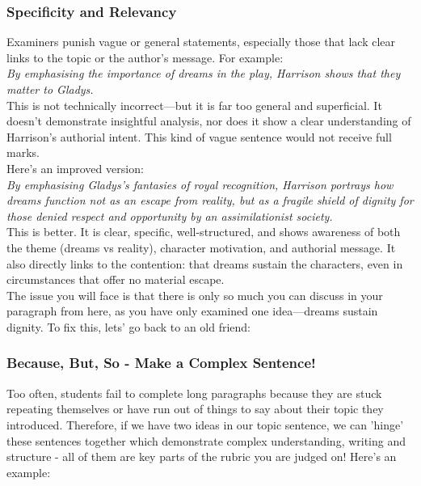 \documentclass[a4paper]{article}
\begin{document}
\subsubsection{Specificity and Relevancy}
Examiners punish vague or general statements, especially those that lack clear links to the topic or the author’s message. For example:\\

\textit{By emphasising the importance of dreams in the play, Harrison shows that they matter to Gladys.}\\

This is not technically incorrect—but it is far too general and superficial. It doesn’t demonstrate insightful analysis, nor does it show a clear understanding of Harrison’s authorial intent. This kind of vague sentence would not receive full marks.\\

Here’s an improved version:\\

\textit{By emphasising Gladys’s fantasies of royal recognition, Harrison portrays how dreams function not as an escape from reality, but as a fragile shield of dignity for those denied respect and opportunity by an assimilationist society.}\\

This is better. It is clear, specific, well-structured, and shows awareness of both the theme (dreams vs reality), character motivation, and authorial message. It also directly links to the contention: that dreams sustain the characters, even in circumstances that offer no material escape.\\

The issue you will face is that there is only so much you can discuss in your paragraph from here, as you have only examined one idea—dreams sustain dignity. To fix this, lets' go back to an old friend:\\

\subsubsection{Because, But, So - Make a Complex Sentence!}
Too often, students fail to complete long paragraphs because they are stuck repeating themselves or have run out of things to say about their topic they introduced. Therefore, if we have two ideas in our topic sentence, we can 'hinge' these sentences together which demonstrate complex understanding, writing and structure - all of them are key parts of the rubric you are judged on!
Here's an example:\\
\end{document}
